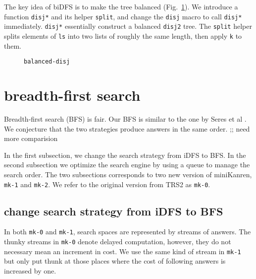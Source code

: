\documentclass[format=acmlarge, review=true, authordraft=true]{acmart}
\begin{document}
The key idea of biDFS is to make the tree balanced (Fig.~\ref{balanced-disj}). 
We introduce a function \texttt{disj*} and its helper \texttt{split}, and change 
the \texttt{disj} macro to call \texttt{disj*} immediately. \texttt{disj*} 
essentially construct a balanced \texttt{disj2} tree. The \texttt{split} helper 
splits elements of \texttt{ls} into two lists of roughly the same length, then 
apply \texttt{k} to them.

\begin{figure}
  
  \caption{\texttt{balanced-disj}}
  \label{balanced-disj}
\end{figure}

\section{breadth-first search}


Breadth-first search (BFS) is fair. Our BFS is similar to the one by Seres et 
al \citet{seres1999algebra}. We conjecture that the two strategies produce
answers in the same order. ;; need more comparision

In the first subsection, we change the search strategy from iDFS to BFS. In the 
second subsection we optimize the search engine by using a queue to manage the 
search order. The two subsections corresponds to two new version of miniKanren, 
\texttt{mk-1} and \texttt{mk-2}. We refer to the original version from TRS2 as 
\texttt{mk-0}. 


\subsection{change search strategy from iDFS to BFS}

In both \texttt{mk-0} and \texttt{mk-1}, search spaces are represented by 
streams of  answers. The thunky streams in \texttt{mk-0} denote delayed 
computation, however, they do not necessary mean an increment in cost. We use 
the same kind of stream in \texttt{mk-1} but only put thunk at those places 
where the cost of following answers is increased by one.
\end{document}
